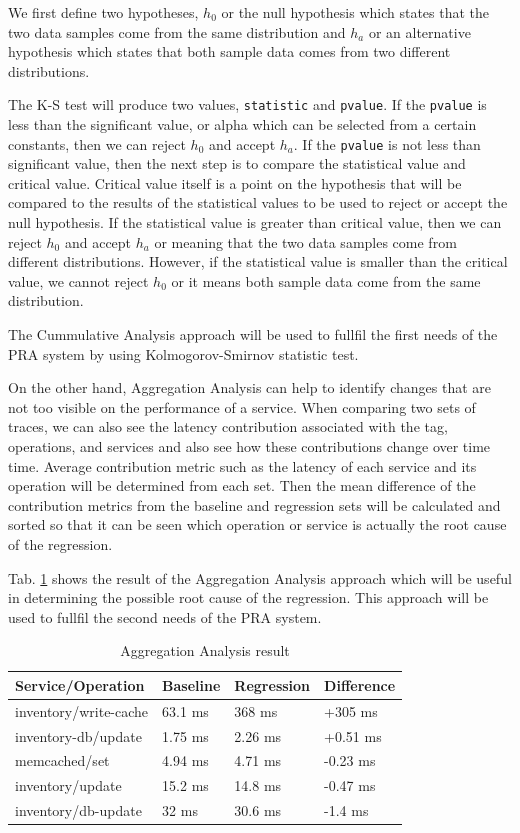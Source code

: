 \documentclass[conference]{configs/IEEEtran}
\begin{document}
We first define two hypotheses, $h_{0}$ or the null hypothesis which states that the two data samples come from the same distribution and $h_{a}$ or an alternative hypothesis which states that both sample data comes from two different distributions.

The K-S test will produce two values, \texttt{statistic} and \texttt{pvalue}. If the \texttt{pvalue} is less than the significant value, or alpha which can be selected from a certain constants,
then we can reject $h_{0}$ and accept $h_{a}$. If the \texttt{pvalue} is not less than significant value, then the next step is to compare the statistical value and critical value. Critical value itself is a point on the hypothesis that will be compared to the results of the statistical values to be used to reject or accept the null hypothesis. If the statistical value is greater than critical value, then we can reject $h_{0}$ and accept $h_{a}$ or meaning that the two data samples come from different distributions. However, if the statistical value is smaller than the critical value, we cannot reject $h_{0}$ or it means both sample data come from the same distribution.

The Cummulative Analysis approach will be used to fullfil the first needs of the PRA system by using Kolmogorov-Smirnov statistic test.

On the other hand, Aggregation Analysis can help to identify changes that are not too visible on the performance of a service. When comparing two sets of traces, we can also see the latency contribution associated with the tag,
operations, and services and also see how these contributions change over time time. Average contribution metric
such as the latency of each service and its operation will be determined from each set. Then the mean difference of the contribution metrics from the baseline and regression sets
will be calculated and sorted so that it can be seen which operation or service is actually the root cause of the regression.

Tab. \ref{aggregate} shows the result of the Aggregation Analysis approach which will be useful in determining the possible root cause of the regression. This approach will be used to fullfil the second needs of the PRA system.
\begin{table}[!htb]
	\caption{Aggregation Analysis result}
	\label{aggregate}
	\centering
	\begin{tabular}{|l|l|l|l|}
		\hline
		\textbf{Service/Operation} & \textbf{Baseline} & \textbf{Regression} & \textbf{Difference} \\ \hline
		inventory/write-cache & 63.1 ms & 368 ms  & +305 ms  \\ \hline
		inventory-db/update   & 1.75 ms & 2.26 ms & +0.51 ms \\ \hline
		memcached/set         & 4.94 ms & 4.71 ms & -0.23 ms \\ \hline
		inventory/update      & 15.2 ms & 14.8 ms & -0.47 ms \\ \hline
		inventory/db-update   & 32 ms   & 30.6 ms & -1.4 ms  \\ \hline
	\end{tabular}
\end{table}
\end{document}
